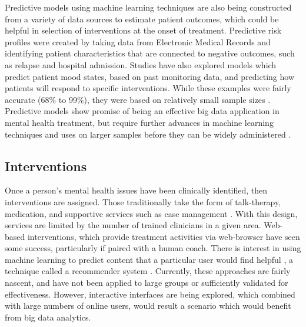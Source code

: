 \documentclass[sigconf]{acmart}
\begin{document}
Predictive models using machine learning techniques are also being constructed from a variety of data sources to estimate patient outcomes, which could be helpful in selection of interventions at the onset of treatment. \cite{bigdatabipolar} Predictive risk profiles were created by taking data from Electronic Medical Records and identifying patient characteristics that are connected to negative outcomes, such as relapse and hospital admission. Studies have also explored models which predict patient mood states, based on past monitoring data, and predicting how patients will respond to specific interventions. While these examples were fairly accurate (68\% to 99\%), they were based on relatively small sample sizes \cite{machinelearnbipolar}.  Predictive models show promise of being an effective big data application in mental health treatment, but require further advances in machine learning techniques and uses on larger samples before they can be widely administered \cite{bigdatabipolar}.
\subsection{Interventions}
Once a person's mental health issues have been clinically identified, then interventions are assigned. Those traditionally take the form of talk-therapy, medication, and supportive services such as case management \cite{samhsatx}. With this design, services are limited by the number of trained clinicians in a given area. Web-based interventions, which provide treatment activities via web-browser have seen some success, particularly if paired with a human coach. There is interest in using machine learning to predict content that a particular user would find helpful \cite{bitreview}, a technique called a recommender system \cite{recomdef}. Currently, these approaches are fairly nascent, and have not been applied to large groups or sufficiently validated for effectiveness. However, interactive interfaces are being explored, \cite{webtx} which combined with large numbers of online users, would result a scenario which would benefit from big data analytics.
\end{document}
